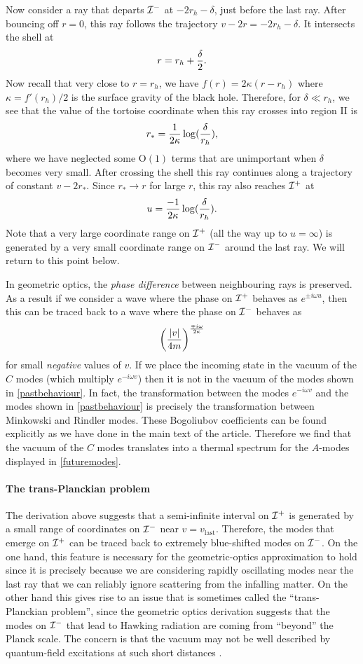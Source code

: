 \documentclass[12pt]{article}
\def\Or[#1]{{\text{O}}\left({#1}\right)}
\def\rtor{{r_*}}
\newcommand{\be}{\begin{equation}}
\newcommand{\ee}{\end{equation}}
\def \scrip{{\cal I}^{+}}
\def \scrim{{\cal I}^{-}}
\begin{document}
Now consider a ray that departs $\scrim$ at $-2 r_h - \delta$, just before the last ray. After bouncing off $r = 0$, this ray follows the trajectory $v - 2 r = -2 r_h - \delta$. It intersects the shell at
\be
r = r_h + {\delta \over 2}.
\ee
Now recall that very close to $r = r_h$, we have $f(r) = 2 \kappa (r - r_h)$ where $\kappa = f'(r_h)/2$ is the surface gravity of the black hole. Therefore, for $\delta \ll r_h$, we see that the value of the tortoise coordinate when this ray crosses into region II is
\be
\rtor = {1 \over 2 \kappa} \log({\delta \over r_h}),
\ee
where we have neglected some $\Or[1]$ terms that are unimportant when $\delta$ becomes very small. After crossing the shell this ray continues along a trajectory of constant $v - 2 \rtor$. Since $\rtor \rightarrow r$ for large $r$, this ray also reaches $\scrip$ at
\be
u = {-1 \over 2 \kappa} \log({\delta \over r_h}).
\ee
Note that a very large coordinate range on ${\cal I}^+$ (all the way up to $u = \infty$) is generated by a very small coordinate range on ${\cal I}^{-}$ around the last ray. We will return to this point below.

In geometric optics, the {\em phase difference} between neighbouring rays is preserved. As a result if we consider a wave where the phase on ${\cal I}^+$ behaves as $e^{\pm i \omega u}$, then this can be traced back to a wave where the phase on ${\cal I}^{-}$ behaves as
\be
\label{pastbehaviour}
\left({|v| \over  4 m}\right)^{\mp  i \omega \over 2 \kappa}
\ee
 for small {\em negative} values of  $v$. If we place the incoming state in the vacuum of the $C$ modes (which multiply $e^{-i \omega v}$) then it is not in the vacuum of the modes shown in \eqref{pastbehaviour}. In fact, the transformation between the modes $e^{-i \omega v}$ and the modes shown in \eqref{pastbehaviour} is precisely the transformation between Minkowski and Rindler modes. These Bogoliubov coefficients can be found explicitly as we have done in the main text of the article. Therefore we find that the vacuum of the $C$ modes translates into a thermal spectrum for the $A$-modes displayed in \eqref{futuremodes}.

\paragraph{\bf The trans-Planckian problem \\}
The derivation above suggests that a semi-infinite interval on $\scrip$ is generated by a small range of coordinates on $\scrim$ near $v = v_{\text{last}}$. Therefore, the modes that emerge on $\scrip$ can be traced back to extremely blue-shifted modes on $\scrim$.  On the one hand, this feature is necessary for the geometric-optics approximation to hold since it is precisely because we are considering rapidly oscillating modes near the last ray that we can reliably ignore
scattering from the infalling matter. On the other hand this gives rise to an issue that is sometimes called the ``trans-Planckian problem'', since the geometric optics derivation suggests that the modes on $\scrim$ that lead to Hawking radiation are coming from ``beyond'' the Planck scale. The concern is that the vacuum may not be well described by quantum-field excitations at such short distances \cite{tHooft:1996rdg}.
\end{document}
